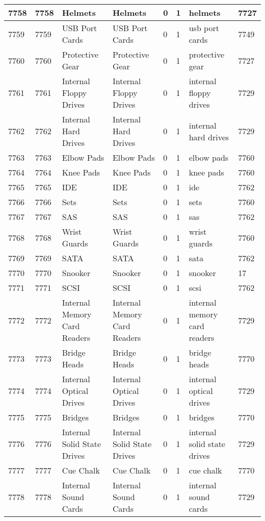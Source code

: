 \begin{longtable}{|l|l|l|l|l|l|l|l|}
7758 & 7758 & Helmets & Helmets & 0 & 1 & helmets & 7727 \\ \hline 
7759 & 7759 & USB Port Cards & USB Port Cards & 0 & 1 & usb port cards & 7749 \\ \hline 
7760 & 7760 & Protective Gear & Protective Gear & 0 & 1 & protective gear & 7727 \\ \hline 
7761 & 7761 & Internal Floppy Drives & Internal Floppy Drives & 0 & 1 & internal floppy drives & 7729 \\ \hline 
7762 & 7762 & Internal Hard Drives & Internal Hard Drives & 0 & 1 & internal hard drives & 7729 \\ \hline 
7763 & 7763 & Elbow Pads & Elbow Pads & 0 & 1 & elbow pads & 7760 \\ \hline 
7764 & 7764 & Knee Pads & Knee Pads & 0 & 1 & knee pads & 7760 \\ \hline 
7765 & 7765 & IDE & IDE & 0 & 1 & ide & 7762 \\ \hline 
7766 & 7766 & Sets & Sets & 0 & 1 & sets & 7760 \\ \hline 
7767 & 7767 & SAS & SAS & 0 & 1 & sas & 7762 \\ \hline 
7768 & 7768 & Wrist Guards & Wrist Guards & 0 & 1 & wrist guards & 7760 \\ \hline 
7769 & 7769 & SATA & SATA & 0 & 1 & sata & 7762 \\ \hline 
7770 & 7770 & Snooker & Snooker & 0 & 1 & snooker & 17 \\ \hline 
7771 & 7771 & SCSI & SCSI & 0 & 1 & scsi & 7762 \\ \hline 
7772 & 7772 & Internal Memory Card Readers & Internal Memory Card Readers & 0 & 1 & internal memory card readers & 7729 \\ \hline 
7773 & 7773 & Bridge Heads & Bridge Heads & 0 & 1 & bridge heads & 7770 \\ \hline 
7774 & 7774 & Internal Optical Drives & Internal Optical Drives & 0 & 1 & internal optical drives & 7729 \\ \hline 
7775 & 7775 & Bridges & Bridges & 0 & 1 & bridges & 7770 \\ \hline 
7776 & 7776 & Internal Solid State Drives & Internal Solid State Drives & 0 & 1 & internal solid state drives & 7729 \\ \hline 
7777 & 7777 & Cue Chalk & Cue Chalk & 0 & 1 & cue chalk & 7770 \\ \hline 
7778 & 7778 & Internal Sound Cards & Internal Sound Cards & 0 & 1 & internal sound cards & 7729 \\ \hline 

\end{longtable}
